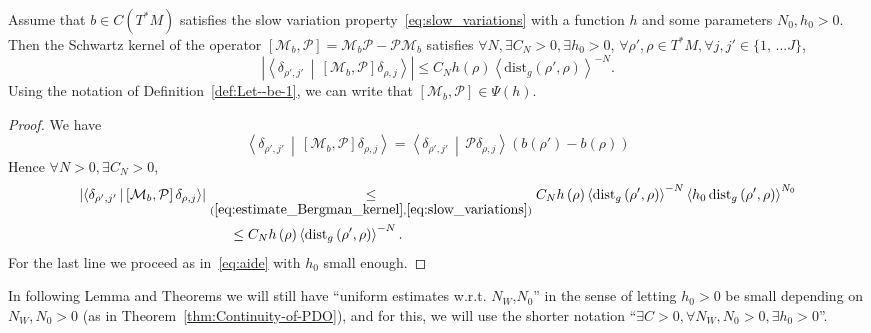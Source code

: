 \documentclass[AHL,Unicode,longabstracts,published]{cedram}
\newcommand{\clM}{\mathcal{M}}
\newcommand{\clP}{\mathcal{P}}
\newcommand{\dist}{\mathrm{dist}}
\let\oldexists\exists
\renewcommand*{\exists}{\mathrel{\oldexists}}
\let\oldforall\forall
\renewcommand*{\forall}{\mathrel{\oldforall}}
\begin{document}
\begin{cBoxB}{}
\begin{lemm}\label{lem:Basic_Lemma}
Assume that $b\in C(T^{*}M)$ satisfies the slow variation property~\eqref{eq:slow_variations} with a function $h$ and some parameters $N_{0},h_{0}>0$. Then the Schwartz kernel of the operator $[\clM_{b},\clP ]=\clM_{b}\clP -\clP \clM_{b}$ satisfies $\forall N,\exists C_{N}>0,\exists h_{0}>0$, $\forall\rho',\rho\in T^{*}M,\forall j,j'\in\{1,\,\ldots J\} $,
\begin{equation}\label{eq:commut_P}
\left|\left\langle\delta_{\rho',j'}\,\middle|\,\left[\clM_{b},\clP \right]\delta_{\rho,j}\right\rangle\right|\leq C_{N}h\left(\rho\right)\left\langle \dist_{g}\left(\rho',\rho\right)\right\rangle ^{-N}.
\end{equation}
Using the notation of Definition~\ref{def:Let--be-1}, we can write that $[\clM_{b},\clP ]\in\Psi(h)$.
\end{lemm}
\end{cBoxB}

\begin{proof}
We have
\[
\left\langle\delta_{\rho',j'}\,\middle|\,\left[\clM_{b},\clP \right]\delta_{\rho,j}\right\rangle=\left\langle\delta_{\rho',j'}\,\middle|\,\clP \delta_{\rho,j}\right\rangle\left(b\left(\rho'\right)-b\left(\rho\right)\right)
\]
Hence $\forall N>0,\exists C_{N}>0$,
\begin{align*}
\left|\left\langle\delta_{\rho',j'}\,\middle|\,\left[\clM_{b},\clP \right]\delta_{\rho,j}\right\rangle\right|&\underset{(\eqref{eq:estimate_Bergman_kernel},\eqref{eq:slow_variations})}{\leq}  C_{N}h\left(\rho\right)\left\langle \dist_{g}\left(\rho',\rho\right)\right\rangle ^{-N}\left\langle h_{0}\,\dist_{g}\left(\rho',\rho\right)\right\rangle ^{N_{0}}
\\
&\mkern30mu\leq  C_{N}h\left(\rho\right)\left\langle \dist_{g}\left(\rho',\rho\right)\right\rangle ^{-N}.
\end{align*}
For the last line we proceed as in~\eqref{eq:aide} with $h_{0}$ small enough.
\end{proof}

\begin{rema}
In following Lemma and Theorems we will still have ``uniform estimates w.r.t. $N_{W}$,$N_{0}$'' in the sense of letting $h_{0}>0$ be small depending on $N_{W},N_{0}>0$ (as in Theorem~\ref{thm:Continuity-of-PDO}), and for this, we will use the shorter notation ``$\exists C>0,\forall N_{W},N_{0}>0,\exists h_{0}>0$''.
\end{rema}
\end{document}
